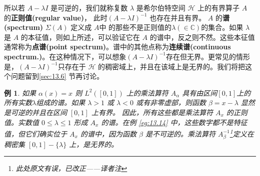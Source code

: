 \documentclass[hyperref,UTF8]{ctexbook}
\newtheorem{eg}{例}[chapter]
\begin{document}
所以若 \(A-\lambda I\) 是可逆的，我们就称复数 \(\lambda\) 是希尔伯特空间 \(\mathcal{H}\) 上的有界算子 \(A\) 的\textbf{正则值(regular value)}， 此时\((A-\lambda I)^{-1}\) 也存在并且有界。 \(A\) 的\textbf{谱(spectrum)} \(\Sigma(A)\) 定义成 \(A\)中 的那些不是正则值的\(\lambda(\in\mathbb{C})\)的集合。如果 \(\lambda\) 是 \(A\) 的本征值，则如上所述，可以验证它在 \(A\) 的谱中，反之则不然。这些本征值通常称为\textbf{点谱(point spectrum)}。谱中的其他点称为\textbf{连续谱(continuous spectrum.)}。在这种情况下，可以想象\((A-\lambda I)^{-1}\)存在但无界。更常见的情形是，\((A-\lambda I)^{-1}\)只存在于 \(\mathcal{H}\) 的稠密域上，并且在该域上是无界的。我们将把这个问题留到\ref{sec:13.6} 节再讨论。
\begin{eg}
    如果 \(\alpha(x)=x\) 则 \(L^{2}([0,1])\) 上的乘法算符 \(A_{\alpha}\) 具有由区间\([0,1]\)上的所有实数\(\lambda\)组成的谱。如果 \(\lambda>1\) 或 \(\lambda<0\) 或有非零虚部，则函数 \(\beta=x-\lambda\) 显然是可逆的并且在区间 \([0,1]\) 上有界。
    因此，所有这些都是乘法算符 \(A_{x}\) 的正则值。实数值 \(0 \leq \lambda \leq 1\) 形成 \(A_{x}\) 的谱。在例 \ref{eg:13.14} 中，这些数字都不是特征值，但它们确实位于 \(A_{x}\) 的谱中，因为函数 \(\beta\) 是不可逆的。乘法算符 \(A^{-1}_{\beta}\)\footnote{此处原文有误，已改正——译者注}定义在稠密集 \([0,1]-\{\lambda\}\) 上，是无界的。
\end{eg}
\end{document}
